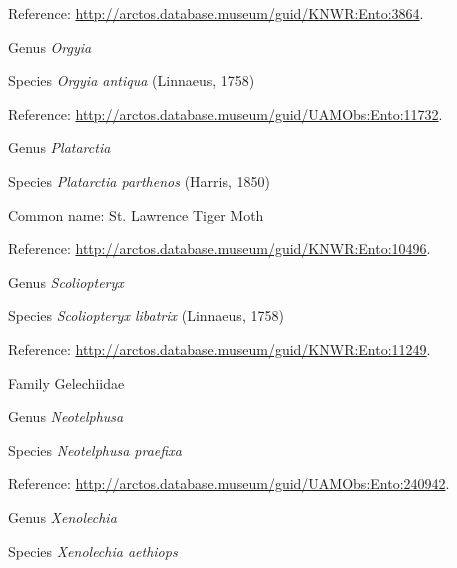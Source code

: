 \documentclass[9pt, article]{memoir}
\begin{document}
\begin{multicols}{2}
Reference: 
\url{http://arctos.database.museum/guid/KNWR:Ento:3864}.

\vspace{6pt}\noindent\hspace{30pt}Genus \textit{Orgyia}


\vspace{6pt}\noindent\hspace{36pt}Species \textit{Orgyia antiqua} (Linnaeus, 1758)


Reference: 
\url{http://arctos.database.museum/guid/UAMObs:Ento:11732}.

\vspace{6pt}\noindent\hspace{30pt}Genus \textit{Platarctia}


\vspace{6pt}\noindent\hspace{36pt}Species \textit{Platarctia parthenos} (Harris, 1850)


Common name: St. Lawrence Tiger Moth

Reference: 
\url{http://arctos.database.museum/guid/KNWR:Ento:10496}.

\vspace{6pt}\noindent\hspace{30pt}Genus \textit{Scoliopteryx}


\vspace{6pt}\noindent\hspace{36pt}Species \textit{Scoliopteryx libatrix} (Linnaeus, 1758)


Reference: 
\url{http://arctos.database.museum/guid/KNWR:Ento:11249}.

\vspace{6pt}\noindent\hspace{24pt}Family Gelechiidae


\vspace{6pt}\noindent\hspace{30pt}Genus \textit{Neotelphusa}


\vspace{6pt}\noindent\hspace{36pt}Species \textit{Neotelphusa praefixa}


Reference: 
\url{http://arctos.database.museum/guid/UAMObs:Ento:240942}.

\vspace{6pt}\noindent\hspace{30pt}Genus \textit{Xenolechia}


\vspace{6pt}\noindent\hspace{36pt}Species \textit{Xenolechia aethiops}



\end{multicols}
\end{document}
